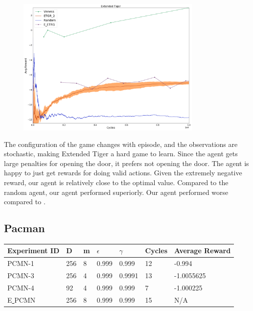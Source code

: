 \documentclass{article}
\theoremstyle{definition}
\newtheorem{primary statistics}[definition]{Primary Statistics}
\newtheorem{auxiliary statistics}[definition]{Auxiliary Statistics}
\begin{document}
 \begin{figure}[h]
 \centering
    \includegraphics[width=9.1cm]{Extended_Tiger}
\end{figure}

The configuration of the game changes with episode, and the observations are stochastic, making Extended Tiger a hard game to learn. Since the agent gets large penalties for opening the door, it prefers not opening the door. The agent is happy to just get rewards for doing valid actions. Given the extremely negative reward, our agent is relatively close to the optimal value. Compared to the random agent, our agent performed superiorly. Our agent performed worse compared to \cite{veness2011monte}.

\newpage

\subsection{Pacman}
 \begin{tabular}{|l|l|l|l|l|l|l|}
 \hline \centering
 Experiment ID& D & m & $\epsilon$ & $\gamma$ & Cycles & Average Reward \\ \hline
PCMN-1  & 256       & 8           & 0.999       & 0.999             & 12     & -0.994        \\ \hline
 PCMN-3    & 256       & 4           & 0.999       & 0.9991            & 13     & -1.0055625       \\ \hline
 PCMN-4     & 92        & 4           & 0.999       & 0.999             & 7      &    -1.000225    \\  \hline 
  E\underline{ }PCMN    & 256        & 8           & 0.999       & 0.999             & 15      &    N/A    \\  \hline     
\end{tabular} \\
\end{document}
